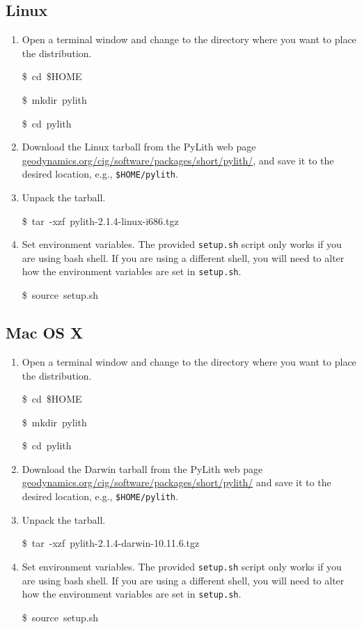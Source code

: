 \subsection{Linux}
\begin{enumerate}
\item Open a terminal window and change to the directory where you want
to place the distribution.

\begin{lyxcode}
\$~cd~\$HOME

\$~mkdir~pylith

\$~cd~pylith
\end{lyxcode}
\item Download the Linux tarball from the PyLith web page \url{geodynamics.org/cig/software/packages/short/pylith/},
and save it to the desired location, e.g., \texttt{\$HOME/pylith}.
\item Unpack the tarball.

\begin{lyxcode}
\$~tar~-xzf~pylith-2.1.4-linux-i686.tgz
\end{lyxcode}
\item Set environment variables. The provided \texttt{setup.sh} script only
works if you are using bash shell. If you are using a different shell,
you will need to alter how the environment variables are set in \texttt{setup.sh}.

\begin{lyxcode}
\$~source~setup.sh
\end{lyxcode}
\end{enumerate}

\subsection{Mac OS X}
\begin{enumerate}
\item Open a terminal window and change to the directory where you want
to place the distribution.

\begin{lyxcode}
\$~cd~\$HOME

\$~mkdir~pylith

\$~cd~pylith
\end{lyxcode}
\item Download the Darwin tarball from the PyLith web page \url{geodynamics.org/cig/software/packages/short/pylith/}
and save it to the desired location, e.g., \texttt{\$HOME/pylith}.
\item Unpack the tarball. 

\begin{lyxcode}
\$~tar~-xzf~pylith-2.1.4-darwin-10.11.6.tgz
\end{lyxcode}
\item Set environment variables. The provided \texttt{setup.sh} script only
works if you are using bash shell. If you are using a different shell,
you will need to alter how the environment variables are set in \texttt{setup.sh}.

\begin{lyxcode}
\$~source~setup.sh
\end{lyxcode}
\end{enumerate}

